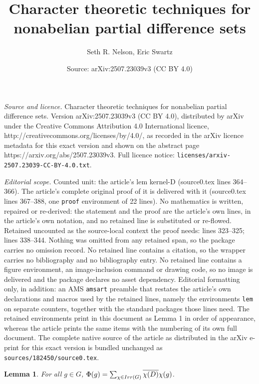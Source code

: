 \documentclass[10pt,a4paper]{amsart}
\title{Character theoretic techniques for nonabelian partial difference sets}
\author{Seth R. Nelson, Eric Swartz}
\date{Source: arXiv:2507.23039v3 (CC BY 4.0)}
\newtheorem{lem}{Lemma}
\newcommand{\Irr}{{\rm Irr}}
\begin{document}
\maketitle

\noindent\emph{Source and licence.} Character theoretic techniques for nonabelian partial difference sets. Version arXiv:2507.23039v3 (CC BY 4.0), distributed by arXiv under the Creative Commons Attribution 4.0 International licence, http://creativecommons.org/licenses/by/4.0/, as recorded in the arXiv licence metadata for this exact version and shown on the abstract page https://arxiv.org/abs/2507.23039v3. Full licence notice: \texttt{licenses/arxiv-2507.23039-CC-BY-4.0.txt}.\par\smallskip

\noindent\textit{Editorial scope.} Counted unit: the article's lem kernel-D (source0.tex lines 364--366). The article's complete original proof of it is delivered with it (source0.tex lines 367--388, one \texttt{proof} environment of 22 lines). No mathematics is written, repaired or re-derived: the statement and the proof are the article's own lines, in the article's own notation, and no retained line is substituted or re-flowed.  Retained uncounted as the source-local context the proof needs: lines 323--325; lines 338--344.  Nothing was omitted from any retained span, so the package carries no omission record.  No retained line contains a citation, so the wrapper carries no bibliography and no bibliography entry.  No retained line contains a figure environment, an image-inclusion command or drawing code, so no image is delivered and the package declares no asset dependency.  Editorial formatting only, in addition: an AMS \texttt{amsart} preamble that restates the article's own declarations and macros used by the retained lines, namely the environments \texttt{lem} on separate counters, together with the standard packages those lines need.  The retained environments print in this document as Lemma 1 in order of appearance, whereas the article prints the same items with the numbering of its own full document.  The complete native source of the article as distributed in the arXiv e-print for this exact version is bundled unchanged as \texttt{sources/182450/source0.tex}.
\begin{lem}\label{phi-function}
	For all $g \in G$,  $\Phi(g) = \sum_{\chi\in\Irr(G)} \overline{\chi(D)} \chi(g)$.
\end{lem}
\end{document}
